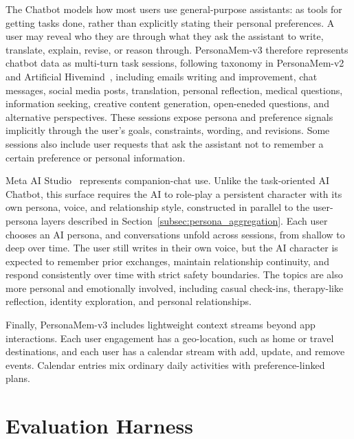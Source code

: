 \documentclass[]{fairmeta}
\begin{document}
The Chatbot models how most users use general-purpose assistants: as tools for getting tasks done, rather than explicitly stating their personal preferences. A user may reveal who they are through what they ask the assistant to write, translate, explain, revise, or reason through. PersonaMem-v3 therefore represents chatbot data as multi-turn task sessions, following taxonomy in PersonaMem-v2~\citep{jiang2025personamem} and Artificial Hivemind~\citep{jiang2026artificial}, including emails writing and improvement, chat messages, social media posts, translation, personal reflection, medical questions, information seeking, creative content generation, open-eneded questions, and alternative perspectives. These sessions expose persona and preference signals implicitly through the user’s goals, constraints, wording, and revisions. Some sessions also include user requests that ask the assistant not to remember a certain preference or personal information.

Meta AI Studio~\citep{meta2026aistudio} represents companion-chat use. Unlike the task-oriented AI Chatbot, this surface requires the AI to role-play a persistent character with its own persona, voice, and relationship style, constructed in parallel to the user-persona layers described in Section~\ref{subsec:persona_aggregation}. Each user chooses an AI persona, and conversations unfold across sessions, from shallow to deep over time. The user still writes in their own voice, but the AI character is expected to remember prior exchanges, maintain relationship continuity, and respond consistently over time with strict safety boundaries. The topics are also more personal and emotionally involved, including casual check-ins, therapy-like reflection, identity exploration, and personal relationships.

Finally, PersonaMem-v3 includes lightweight context streams beyond app interactions. Each user engagement has a geo-location, such as home or travel destinations, and each user has a calendar stream with add, update, and remove events. Calendar entries mix ordinary daily activities with preference-linked plans.


\section{Evaluation Harness}
\label{section:eval}
\end{document}
